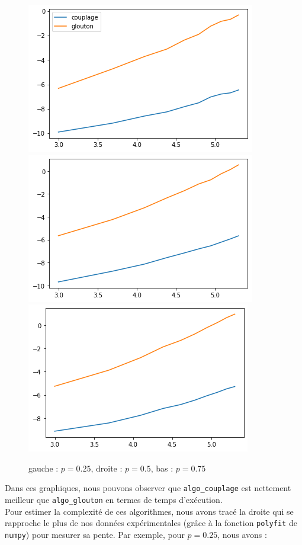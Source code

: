 \documentclass[12pt]{article}
\begin{document}
\begin{enumerate}
                \begin{figure}[H]
                    \caption{gauche : $p=0.25$, droite : $p=0.5$, bas : $p=0.75$}
                    \includegraphics[scale=0.5]{figures/tps_exec_couglou25.png}
                    \includegraphics[scale=0.5]{figures/tps_exec_couglou5.png}
                    \includegraphics[scale=0.5]{figures/tps_exec_couglou75.png}
                    \centering
                \end{figure}

                Dans ces graphiques, nous pouvons observer que \texttt{algo\_couplage} est nettement meilleur que \texttt{algo\_glouton} en termes de temps d'exécution. \\
                Pour estimer la complexité de ces algorithmes, nous avons tracé la droite qui se rapproche le plus de nos données expérimentales (grâce à la fonction \texttt{polyfit} de \texttt{numpy}) pour mesurer sa pente. Par exemple, pour $p=0.25$, nous avons :
                

\end{enumerate}
\end{document}
